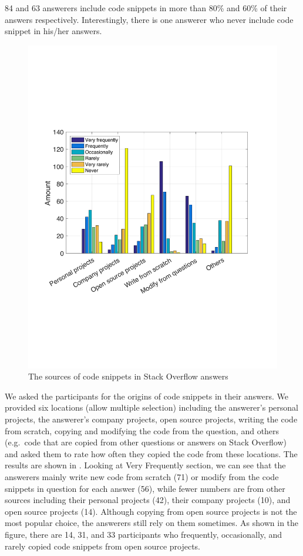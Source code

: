 \documentclass[10pt,journal,compsoc]{IEEEtran}
\begin{document}
84 and 63 answerers include code snippets in more than 80\% and 60\% of
their answers respectively. Interestingly, there is one answerer who never
include code snippet in his/her answers.

\begin{figure}
	\centering
	\includegraphics[width=0.9\linewidth]{survey_snippet_source}
	\caption{The sources of code snippets in Stack Overflow answers}
	\label{fig:survey_snippet_source}
\end{figure}

We asked the participants for the origins of code snippets in their answers. We
provided six locations (allow multiple selection) including the answerer's
personal projects, the answerer's company projects, open source projects,
writing the code from scratch, copying and modifying the code from the question,
and others (e.g.~code that are copied from other questions or answers on Stack
Overflow) and asked them to rate how often they copied the code from these
locations. The results are shown in . Looking at
Very Frequently section, we can see that the answerers mainly write new code
from scratch (71) or modify from the code snippets in question for each answer
(56), while fewer numbers are from other sources including their personal
projects (42), their company projects (10), and open source projects (14).
Although copying from open source projects is not the most popular choice, the answerers
still rely on them sometimes. As shown in the figure, there are 14, 31, and 33
participants who frequently, occasionally, and rarely copied code snippets from open
source projects.
\end{document}
